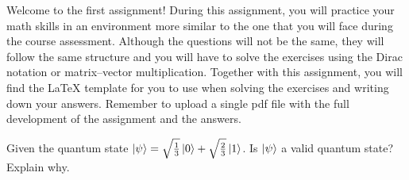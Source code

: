Welcome to the first assignment! During this assignment, you will practice your math skills in an environment more similar to the one that you will face during the course assessment. Although the questions will not be the same, they will follow the same structure and you will have to solve the exercises using the Dirac notation or matrix--vector multiplication. Together with this assignment, you will find the \LaTeX { template} for you to use when solving the exercises and writing down your answers. Remember to upload a single pdf file with the full development of the assignment and the answers.
\begin{question}
	Given the quantum state $\ket{\psi} = \sqrt{\frac{1}{3}} \ket{0} + \sqrt{\frac{2}{3}} \ket{1}$. Is $\ket{\psi}$ a valid quantum state? Explain why.
	\label{qst:assignment1_1}
\end{question}
